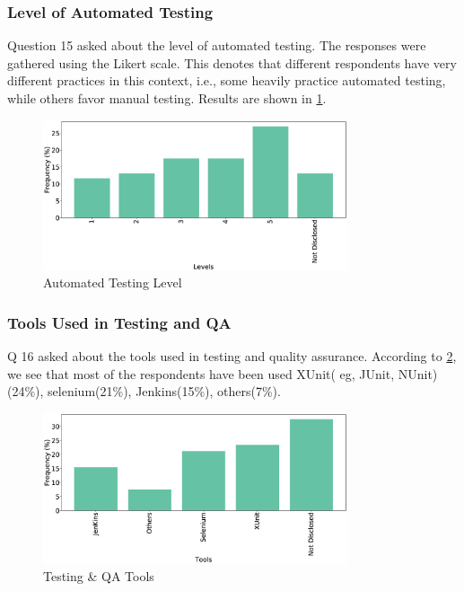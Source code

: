 \subsubsection{Level of Automated Testing}
Question 15 asked about the level of automated testing. The responses were gathered using the Likert scale. This denotes that different respondents have very different practices in this context, i.e., some heavily practice automated testing, while others favor manual testing. Results are shown in \cref{fig:autoTest}.
\begin{figure}[]
\centering
  \includegraphics[width=0.8\textwidth]{Figures/Respondents_autotest_level}
  \caption{Automated Testing Level}
  \label{fig:autoTest}
\end{figure}

\subsubsection{Tools Used in Testing and QA}
Q 16 asked about the tools used in testing and quality assurance. According to \cref{fig:testingTools}, we see that most of the respondents have been used XUnit( eg, JUnit, NUnit) (24\%), selenium(21\%), Jenkins(15\%), others(7\%).
\begin{figure}[]
\centering
  \includegraphics[width=0.8\textwidth]{Figures/Respondents_testing_tools}
  \caption{Testing \& QA Tools}
  \label{fig:testingTools}
\end{figure}

